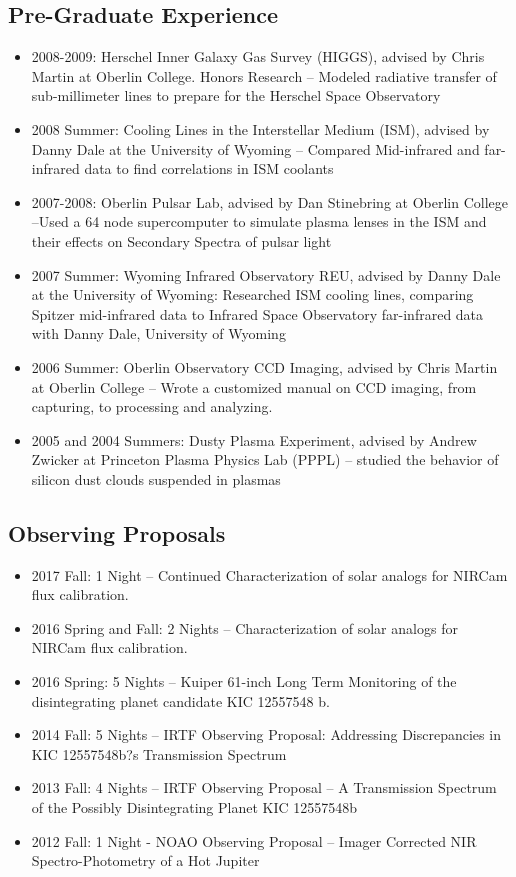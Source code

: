 \documentclass[11pt, oneside]{article}   	%
\begin{document}
\subsection*{Pre-Graduate Experience}
\begin{itemize}[noitemsep]
	\item 2008-2009: Herschel Inner Galaxy Gas Survey (HIGGS), advised by Chris Martin at Oberlin College. Honors Research -- Modeled radiative transfer of sub-millimeter lines to prepare for the Herschel Space Observatory
	\item 2008 Summer: Cooling Lines in the Interstellar Medium (ISM), advised by Danny Dale at the University of Wyoming -- Compared Mid-infrared and far-infrared data to find correlations in ISM coolants
	\item 2007-2008: Oberlin Pulsar Lab, advised by Dan Stinebring at Oberlin College --Used a 64 node supercomputer to simulate plasma lenses in the ISM and their effects on Secondary Spectra of pulsar light
	\item 2007 Summer: Wyoming Infrared Observatory REU, advised by Danny Dale at the University of Wyoming: Researched ISM cooling lines, comparing Spitzer mid-infrared data to Infrared Space Observatory far-infrared data with Danny Dale, University of Wyoming
	\item 2006 Summer: Oberlin Observatory CCD Imaging, advised by Chris Martin at Oberlin College -- Wrote a customized manual on CCD imaging, from capturing, to processing and analyzing.
	\item 2005 and 2004 Summers: Dusty Plasma Experiment, advised by Andrew Zwicker at Princeton Plasma Physics Lab (PPPL) -- studied the behavior of silicon dust clouds suspended in plasmas
\end{itemize}

\subsection*{Observing Proposals}
\begin{itemize}[noitemsep]
    \item 2017 Fall: 1 Night -- Continued Characterization of solar analogs for NIRCam flux calibration.
    \item 2016 Spring and Fall: 2 Nights -- Characterization of solar analogs for NIRCam flux calibration.
    \item 2016 Spring: 5 Nights -- Kuiper 61-inch Long Term Monitoring of the disintegrating planet candidate KIC 12557548 b.
    \item 2014 Fall: 5 Nights -- IRTF Observing Proposal: Addressing Discrepancies in KIC 12557548b?s Transmission Spectrum
    \item 2013 Fall: 4 Nights -- IRTF Observing Proposal -- A Transmission Spectrum of the Possibly Disintegrating Planet KIC 12557548b
    \item 2012 Fall: 1 Night - NOAO Observing Proposal -- Imager Corrected NIR Spectro-Photometry of a Hot Jupiter
\end{itemize}
\end{document}
